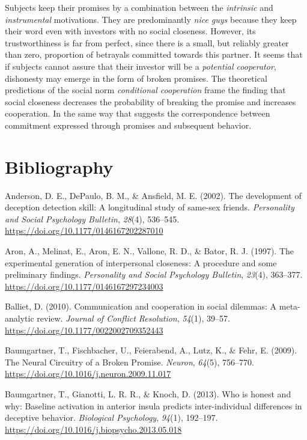 \documentclass[12pt,]{article}
\begin{document}
Subjects keep their promises by a combination between the
\emph{intrinsic} and \emph{instrumental} motivations. They are
predominantly \emph{nice guys} because they keep their word even with
investors with no social closeness. However, its trustworthiness is far
from perfect, since there is a small, but reliably greater than zero,
proportion of betrayals committed towards this partner. It seems that if
subjects cannot assure that their investor will be a \emph{potential
cooperator}, dishonesty may emerge in the form of broken promises. The
theoretical predictions of the social norm \emph{conditional
cooperation} frame the finding that social closeness decreases the
probability of breaking the promise and increases cooperation. In the
same way that suggests the correspondence between commitment expressed
through promises and subsequent behavior.

\hypertarget{bibliography}{%
\section*{Bibliography}\label{bibliography}}

\hypertarget{refs}{}
\leavevmode\hypertarget{ref-Anderson2002}{}%
Anderson, D. E., DePaulo, B. M., \& Ansfield, M. E. (2002). The
development of deception detection skill: A longitudinal study of
same-sex friends. \emph{Personality and Social Psychology Bulletin},
\emph{28}(4), 536--545. \url{https://doi.org/10.1177/0146167202287010}

\leavevmode\hypertarget{ref-Aron1997}{}%
Aron, A., Melinat, E., Aron, E. N., Vallone, R. D., \& Bator, R. J.
(1997). The experimental generation of interpersonal closeness: A
procedure and some preliminary findings. \emph{Personality and Social
Psychology Bulletin}, \emph{23}(4), 363--377.
\url{https://doi.org/10.1177/0146167297234003}

\leavevmode\hypertarget{ref-Balliet2010}{}%
Balliet, D. (2010). Communication and cooperation in social dilemmas: A
meta-analytic review. \emph{Journal of Conflict Resolution},
\emph{54}(1), 39--57. \url{https://doi.org/10.1177/0022002709352443}

\leavevmode\hypertarget{ref-Baumgartner2009}{}%
Baumgartner, T., Fischbacher, U., Feierabend, A., Lutz, K., \& Fehr, E.
(2009). The Neural Circuitry of a Broken Promise. \emph{Neuron},
\emph{64}(5), 756--770.
\url{https://doi.org/10.1016/j.neuron.2009.11.017}

\leavevmode\hypertarget{ref-Baumgartner2013}{}%
Baumgartner, T., Gianotti, L. R. R., \& Knoch, D. (2013). Who is honest
and why: Baseline activation in anterior insula predicts
inter-individual differences in deceptive behavior. \emph{Biological
Psychology}, \emph{94}(1), 192--197.
\url{https://doi.org/10.1016/j.biopsycho.2013.05.018}
\end{document}
